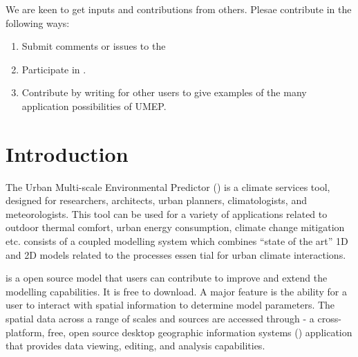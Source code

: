 \documentclass[letterpaper,10pt,english]{sphinxmanual}
\begin{document}
We are keen to get inputs and contributions from others. Plesae contribute in the following ways:
\begin{enumerate}
\item {} 
Submit comments or issues to the 

\item {} 
Participate in {\hyperref[\detokenize{How_to_Contribute::doc}]{}}.

\item {} 
Contribute by writing {\hyperref[\detokenize{Tutorials/Tutorials::doc}]{}} for other users to give examples of the many application possibilities of UMEP.

\end{enumerate}


\chapter{Introduction}
\label{\detokenize{Introduction:introduction}}\label{\detokenize{Introduction:id1}}\label{\detokenize{Introduction::doc}}
The Urban Multi-scale Environmental Predictor () is a climate
services tool, designed for researchers, architects, urban planners,
climatologists, and meteorologists. This tool can be used for a variety
of applications related to outdoor thermal comfort, urban energy
consumption, climate change mitigation etc.  consists of a
coupled modelling system which combines “state of the art” 1D and 2D
models related to the processes essen tial for urban climate
interactions.

 is a {\hyperref[\detokenize{People_Involved___Acknowledgements::doc}]{}} open
source model that users can contribute to improve and extend the
modelling capabilities. It is free to download. A major feature is the
ability for a user to interact with spatial information to determine
model parameters. The spatial data across a range of scales and sources
are accessed through  - a cross-platform, free, open source
desktop geographic information systems
({\hyperref[\detokenize{Abbreviations::doc}]{}}) application \textendash{}
that provides data viewing, editing, and analysis capabilities.
\end{document}
